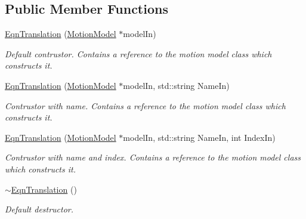 \subsection*{Public Member Functions}
\begin{DoxyCompactItemize}
\item 
\hyperlink{classosea_1_1ofreq_1_1_eqn_translation_afa65eb0f7d46e25938a73a7a9551784b}{Eqn\-Translation} (\hyperlink{classosea_1_1ofreq_1_1_motion_model}{Motion\-Model} $\ast$model\-In)
\begin{DoxyCompactList}\small\item\em Default contrustor. Contains a reference to the motion model class which constructs it. \end{DoxyCompactList}\item 
\hyperlink{classosea_1_1ofreq_1_1_eqn_translation_ac4a2602609edc1b3ca19b86940880ee5}{Eqn\-Translation} (\hyperlink{classosea_1_1ofreq_1_1_motion_model}{Motion\-Model} $\ast$model\-In, std\-::string Name\-In)
\begin{DoxyCompactList}\small\item\em Contrustor with name. Contains a reference to the motion model class which constructs it. \end{DoxyCompactList}\item 
\hyperlink{classosea_1_1ofreq_1_1_eqn_translation_ab6f7dccce7f207cf6fb0f506772f053a}{Eqn\-Translation} (\hyperlink{classosea_1_1ofreq_1_1_motion_model}{Motion\-Model} $\ast$model\-In, std\-::string Name\-In, int Index\-In)
\begin{DoxyCompactList}\small\item\em Contrustor with name and index. Contains a reference to the motion model class which constructs it. \end{DoxyCompactList}\item 
\hypertarget{classosea_1_1ofreq_1_1_eqn_translation_a877b27d79911a4a5cb1d905221178cc6}{\hyperlink{classosea_1_1ofreq_1_1_eqn_translation_a877b27d79911a4a5cb1d905221178cc6}{$\sim$\-Eqn\-Translation} ()}\label{classosea_1_1ofreq_1_1_eqn_translation_a877b27d79911a4a5cb1d905221178cc6}

\begin{DoxyCompactList}\small\item\em Default destructor. \end{DoxyCompactList}\end{DoxyCompactItemize}
